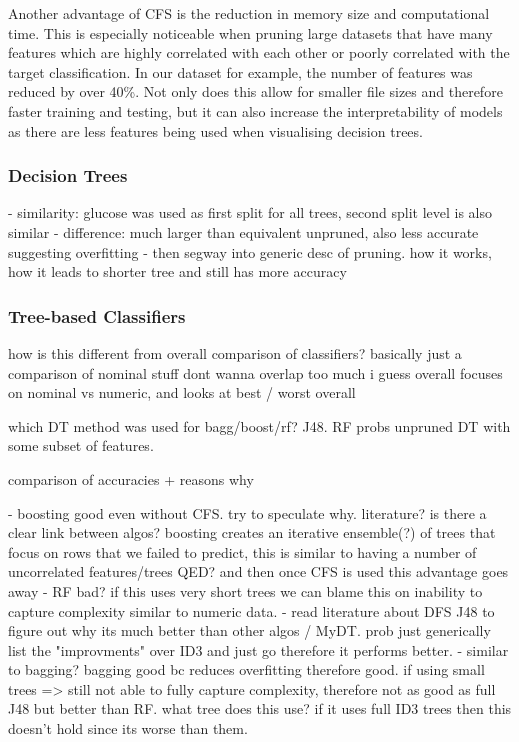 Another advantage of CFS is the reduction in memory size and computational time. This is especially noticeable when pruning large datasets that have many features which are highly correlated with each other  or poorly correlated with the target classification. In our dataset for example, the number of features was reduced by over 40\%. Not only does this allow for smaller file sizes and therefore faster training and testing, but it can also increase the interpretability of models as there are less features being used when visualising decision trees.

\subsubsection{Decision Trees}




- similarity: glucose was used as first split for all trees, second split level is also similar
- difference: much larger than equivalent unpruned, also less accurate suggesting overfitting
- then segway into generic desc of pruning. how it works, how it leads to shorter tree and still has more accuracy



\subsubsection{Tree-based Classifiers}


how is this different from overall comparison of classifiers? basically just a comparison of nominal stuff
dont wanna overlap too much
i guess overall focuses on nominal vs numeric, and looks at best / worst overall

which DT method was used for bagg/boost/rf? J48. 
RF probs unpruned DT with some subset of features.

comparison of accuracies + reasons why


- boosting good even without CFS. try to speculate why. literature? is there a clear link between algos? boosting creates an iterative ensemble(?) of trees that focus on rows that we failed to predict, this is similar to having a number of uncorrelated features/trees QED? and then once CFS is used this advantage goes away
- RF bad? if this uses very short trees we can blame this on inability to capture complexity similar to numeric data.
- read literature about DFS J48 to figure out why its much better than other algos / MyDT. prob just generically list the "improvments" over ID3 and just go therefore it performs better.
- similar to bagging? bagging good bc reduces overfitting therefore good. if using small trees => still not able to fully capture complexity, therefore not as good as full J48 but better than RF. what tree does this use? if it uses full ID3 trees then this doesn't hold since its worse than them.


